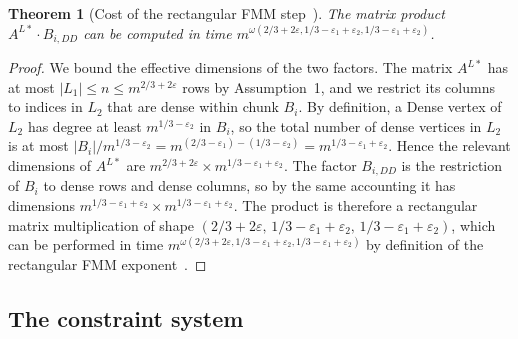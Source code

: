 \documentclass[sigconf,nonacm]{acmart}
\theoremstyle{plain}
\newtheorem{theorem}{Theorem}
\theoremstyle{definition}
\newcommand{\rfmm}[3]{\omega(#1,#2,#3)}
\begin{document}
\begin{theorem}[Cost of the rectangular FMM step~{\cite[Claim~3.6]{AssadiShah25}}]
\label{thm:fmm-step}
The matrix product $A^{L*}\!\cdot\!B_{i,DD}$ can be computed in time
$m^{\rfmm{2/3+2\varepsilon}{1/3-\varepsilon_1+\varepsilon_2}{1/3-\varepsilon_1+\varepsilon_2}}$.
\end{theorem}

\begin{proof}
We bound the effective dimensions of the two factors. The matrix
$A^{L*}$ has at most $|L_1| \le n \le m^{2/3+2\varepsilon}$ rows by
Assumption~1, and we restrict its columns to indices in $L_2$ that
are dense within chunk $B_i$. By definition, a Dense vertex of
$L_2$ has degree at least $m^{1/3-\varepsilon_2}$ in $B_i$, so the
total number of dense vertices in $L_2$ is at most
$|B_i|/m^{1/3-\varepsilon_2} = m^{(2/3-\varepsilon_1)-(1/3-\varepsilon_2)} = m^{1/3-\varepsilon_1+\varepsilon_2}$.
Hence the relevant dimensions of $A^{L*}$ are
$m^{2/3+2\varepsilon} \times m^{1/3-\varepsilon_1+\varepsilon_2}$.
The factor $B_{i,DD}$ is the restriction of $B_i$ to dense rows and
dense columns, so by the same accounting it has dimensions
$m^{1/3-\varepsilon_1+\varepsilon_2}\times m^{1/3-\varepsilon_1+\varepsilon_2}$.
The product is therefore a rectangular matrix multiplication of
shape $(2/3+2\varepsilon,\,1/3-\varepsilon_1+\varepsilon_2,\,1/3-\varepsilon_1+\varepsilon_2)$,
which can be performed in time
$m^{\rfmm{2/3+2\varepsilon}{1/3-\varepsilon_1+\varepsilon_2}{1/3-\varepsilon_1+\varepsilon_2}}$
by definition of the rectangular FMM exponent~\cite{ADW25}. \qedhere
\end{proof}

\subsection{The constraint system}
\label{sec:fmm:constraints}
\end{document}

